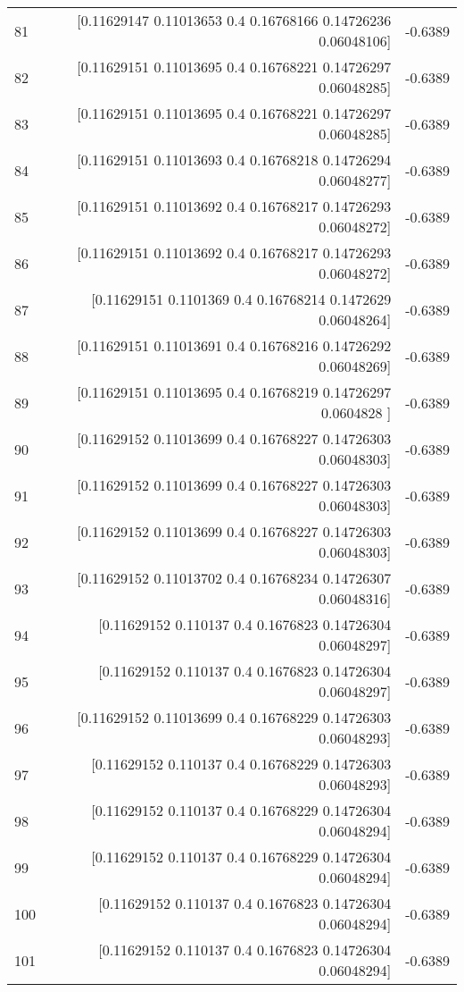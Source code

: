 \begin{longtable}{lrr}
81 & [0.11629147 0.11013653 0.4        0.16768166 0.14726236 0.06048106] & -0.6389 \\
82 & [0.11629151 0.11013695 0.4        0.16768221 0.14726297 0.06048285] & -0.6389 \\
83 & [0.11629151 0.11013695 0.4        0.16768221 0.14726297 0.06048285] & -0.6389 \\
84 & [0.11629151 0.11013693 0.4        0.16768218 0.14726294 0.06048277] & -0.6389 \\
85 & [0.11629151 0.11013692 0.4        0.16768217 0.14726293 0.06048272] & -0.6389 \\
86 & [0.11629151 0.11013692 0.4        0.16768217 0.14726293 0.06048272] & -0.6389 \\
87 & [0.11629151 0.1101369  0.4        0.16768214 0.1472629  0.06048264] & -0.6389 \\
88 & [0.11629151 0.11013691 0.4        0.16768216 0.14726292 0.06048269] & -0.6389 \\
89 & [0.11629151 0.11013695 0.4        0.16768219 0.14726297 0.0604828 ] & -0.6389 \\
90 & [0.11629152 0.11013699 0.4        0.16768227 0.14726303 0.06048303] & -0.6389 \\
91 & [0.11629152 0.11013699 0.4        0.16768227 0.14726303 0.06048303] & -0.6389 \\
92 & [0.11629152 0.11013699 0.4        0.16768227 0.14726303 0.06048303] & -0.6389 \\
93 & [0.11629152 0.11013702 0.4        0.16768234 0.14726307 0.06048316] & -0.6389 \\
94 & [0.11629152 0.110137   0.4        0.1676823  0.14726304 0.06048297] & -0.6389 \\
95 & [0.11629152 0.110137   0.4        0.1676823  0.14726304 0.06048297] & -0.6389 \\
96 & [0.11629152 0.11013699 0.4        0.16768229 0.14726303 0.06048293] & -0.6389 \\
97 & [0.11629152 0.110137   0.4        0.16768229 0.14726303 0.06048293] & -0.6389 \\
98 & [0.11629152 0.110137   0.4        0.16768229 0.14726304 0.06048294] & -0.6389 \\
99 & [0.11629152 0.110137   0.4        0.16768229 0.14726304 0.06048294] & -0.6389 \\
100 & [0.11629152 0.110137   0.4        0.1676823  0.14726304 0.06048294] & -0.6389 \\
101 & [0.11629152 0.110137   0.4        0.1676823  0.14726304 0.06048294] & -0.6389 \\

\end{longtable}
